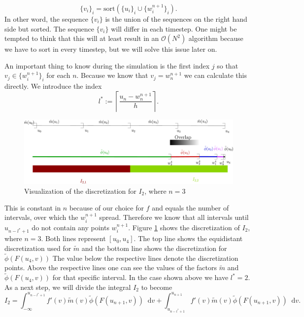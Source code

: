 \documentclass[12pt,a4paper,twoside, open=right]{scrreprt}
\theoremstyle{definition}
\theoremstyle{plain}
\newcommand{\D}{\mathop{}\!\mathrm{d}}
\begin{document}
\begin{equation}
    \{v_i\}_i=\text{sort}(\{u_i\}_i\cup \{w_i^{n+1}\}_i).
\end{equation}
In other word, the sequence $\{v_i\}$ is the union of the sequences on the right hand side but sorted. The sequence $\{v_i\}$ will differ in each timestep. One might be tempted to think that this will at least result in an $\mathcal{O}(N^2)$ algorithm because we have to sort in every timestep, but we will solve this issue later on.
\par An important thing to know during the simulation is the first index $j$ so that $v_j\in\{w_i^{n+1}\}_i$ for each $n$. Because we know that $v_j = w_{n}^{n+1}$ we can calculate this directly. We introduce the index
\begin{equation}
    l^*:=\left\lceil  \frac{u_n -w_{n}^{n+1}}{h}\right\rceil.
\end{equation}
\begin{figure}
    \centering
    \includegraphics[width=\textwidth]{I2ls2}
    \caption{Visualization of the discretization for $I_2$, where $n=3$}
    \label{fig:vis1}
\end{figure}
This is constant in $n$ because of our choice for $f$ and equals the number of intervals, over which the $w_i^{n+1}$ spread. Therefore we know that all intervals until $u_{n-l^*+1}$ do not contain any points $w_i^{n+1}$.
 Figure \ref{fig:vis1} shows the discretization of $I_2$, where $n=3$. Both lines represent $[u_0,u_4]$. The top line shows the equidistant discretization used for $\tilde{m}$ and the bottom line shows the discretization for $\tilde\phi(F(u_{4},v))$ The value below the respective lines denote the discretization points. Above the respective lines one can see the values of the factors $\tilde{m}$ and $\tilde\phi(F(u_4,v))$ for that specific interval. In the case shown above we have $l^*=2$. As a next step, we will divide the integral $I_2$ to become
\begin{equation}
    I_2 = \int_{-\infty}^{u_{n-l^*+1}}f'(v)\tilde{m}(v)\tilde{\phi}(F(u_{n+1},v))\D v + \int_{u_{n-l^* +1}}^{u_{n+1}}f'(v)\tilde{m}(v)\tilde{\phi}(F(u_{n+1},v))\D v.
\end{equation}
\end{document}
